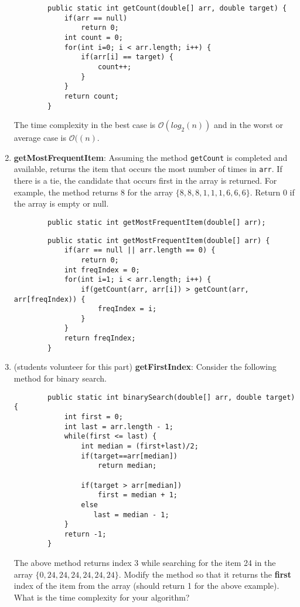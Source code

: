 \begin{questions}
\begin{enumerate}
	\ifprintanswers
		\begin{lstlisting}
		public static int getCount(double[] arr, double target) {
			if(arr == null)
				return 0;	
			int count = 0;
			for(int i=0; i < arr.length; i++) {
				if(arr[i] == target) {
					count++;
				}
			}
			return count;
		}
	\end{lstlisting}
	
	The time complexity in the best case is $\mathcal{O}(log_2(n))$ and in the worst or average case is $\mathcal{O}((n)$.
	\else
	\fi
	
	
	\item \textbf{getMostFrequentItem}: Assuming the method \texttt{getCount} is completed and available, returns the item that occurs the most number of times in \texttt{arr}. If there is a tie, the candidate that occurs first in the array is returned. For example, the method returns 8 for the array $\{8,8,8,1,1,1,6,6,6\}$. Return 0 if the array is empty or null.
	
	\begin{lstlisting}
		public static int getMostFrequentItem(double[] arr);		
	\end{lstlisting}

	\ifprintanswers
	\begin{lstlisting}
		public static int getMostFrequentItem(double[] arr) {
			if(arr == null || arr.length == 0) {
				return 0;
			int freqIndex = 0;
			for(int i=1; i < arr.length; i++) {
				if(getCount(arr, arr[i]) > getCount(arr, arr[freqIndex)) {
					freqIndex = i;
				}
			}
			return freqIndex;
		}	
	\end{lstlisting}
	\else
	\fi
		
	\item (students volunteer for this part) \textbf{getFirstIndex}: Consider the following method for binary search.
	
	\begin{lstlisting}
		public static int binarySearch(double[] arr, double target) {
			int first = 0;
			int last = arr.length - 1;
			while(first <= last) {
   				int median = (first+last)/2;
   				if(target==arr[median])
					return median;
					   
   				if(target > arr[median])
					first = median + 1;
				else
				   last = median - 1;
			}
			return -1;
		}	
	\end{lstlisting}

The above method returns index 3 while searching for the item 24 in the array $\{0,24,24,24,24,24,24\}$. Modify the method so that it returns the \textbf{first} index of the item from the array (should return 1 for the above example). What is the time complexity for your algorithm?


\end{enumerate}
\end{questions}
